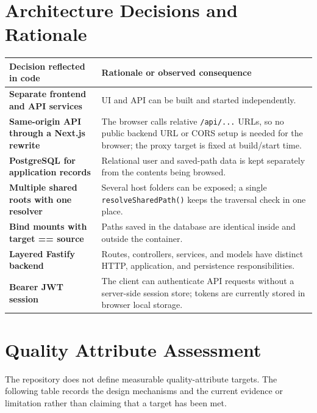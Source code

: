 \documentclass[10pt]{article}
\begin{document}
\section{Architecture Decisions and Rationale}
\begin{tabularx}{\linewidth}{>{\raggedright\arraybackslash\bfseries}p{4.2cm}X}
Decision reflected in code & Rationale or observed consequence \\
\hline
Separate frontend and API services & UI and API can be built and started independently. \\
Same-origin API through a Next.js rewrite & The browser calls relative \texttt{/api/...} URLs, so no public backend URL or CORS setup is needed for the browser; the proxy target is fixed at build/start time. \\
PostgreSQL for application records & Relational user and saved-path data is kept separately from the contents being browsed. \\
Multiple shared roots with one resolver & Several host folders can be exposed; a single \texttt{resolveSharedPath()} keeps the traversal check in one place. \\
Bind mounts with target == source & Paths saved in the database are identical inside and outside the container. \\
Layered Fastify backend & Routes, controllers, services, and models have distinct HTTP, application, and persistence responsibilities. \\
Bearer JWT session & The client can authenticate API requests without a server-side session store; tokens are currently stored in browser local storage. \\
\end{tabularx}

\section{Quality Attribute Assessment}
The repository does not define measurable quality-attribute targets. The following table records
the design mechanisms and the current evidence or limitation rather than claiming that a target
has been met.
\end{document}
